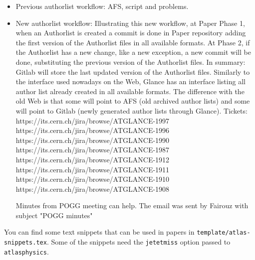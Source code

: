 \begin{itemize}
\item Previous authorlist workflow:
AFS, script and problems.

\item New authorlist workflow:
Illustrating this new workflow, at Paper Phase 1, when an Authorlist is created a commit is done in Paper repository adding the first version of the Authorlist files in all available formats. At Phase 2, if the Authorlist has a new change, like a new exception, a new commit will be done, substituting the previous version of the Authorlist files.
In summary: Gitlab will store the last updated version of the Authorlist files.
Similarly to the interface used nowadays on the Web, Glance has an interface listing all author list already created in all available formats. The difference with the old Web is that some will point to AFS (old archived author lists) and some will point to Gitlab (newly generated author lists through Glance).
Tickets:
https://its.cern.ch/jira/browse/ATGLANCE-1997
https://its.cern.ch/jira/browse/ATGLANCE-1996
https://its.cern.ch/jira/browse/ATGLANCE-1990
https://its.cern.ch/jira/browse/ATGLANCE-1987
https://its.cern.ch/jira/browse/ATGLANCE-1912
https://its.cern.ch/jira/browse/ATGLANCE-1911
https://its.cern.ch/jira/browse/ATGLANCE-1910
https://its.cern.ch/jira/browse/ATGLANCE-1908

Minutes from POGG meeting can help. The email was sent by Fairouz with subject "POGG minutes"
\end{itemize}

You can find some text snippets that can be used in papers in \texttt{template/atlas-snippets.tex}.
Some of the snippets need the \texttt{jetetmiss} option passed to \texttt{atlasphysics}.
%

